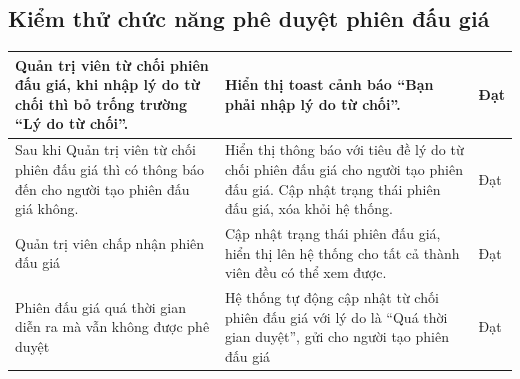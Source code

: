 \documentclass[../DoAn.tex]{subfiles}
\begin{document}
\subsection{Kiểm thử chức năng phê duyệt phiên đấu giá}
    \tabletail{\hline}
    \label{bang415}
    \begin{supertabular}{| p{.45\textwidth}|p{.30\textwidth}|p{.15\textwidth}|} 
    \hline
        Quản trị viên từ chối phiên đấu giá, khi nhập lý do từ chối thì bỏ trống trường “Lý do từ chối”.
        
        & Hiển thị toast cảnh báo “Bạn phải nhập lý do từ chối”.&Đạt \\\hline
        Sau khi Quản trị viên từ chối phiên đấu giá thì có thông báo đến cho người tạo phiên đấu giá không.
        & Hiển thị thông báo với tiêu đề lý do từ chối phiên đấu giá cho người tạo phiên đấu giá. Cập nhật trạng thái phiên đấu giá, xóa khỏi hệ thống. &Đạt \\\hline
        Quản trị viên chấp nhận phiên đấu giá
        & Cập nhật trạng thái phiên đấu giá, hiển thị lên hệ thống cho tất cả thành viên đều có thể xem được. &Đạt \\\hline
        Phiên đấu giá quá thời gian diễn ra mà vẫn không được phê duyệt
        & Hệ thống tự động cập nhật từ chối phiên đấu giá với lý do là “Quá thời gian duyệt”, gửi cho người tạo phiên đấu giá&Đạt \\\hline
    \end{supertabular}
\end{document}
